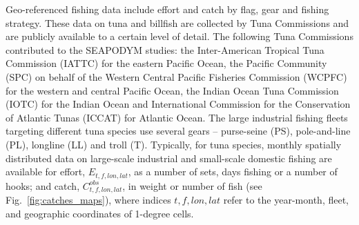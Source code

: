 Geo-referenced fishing data include effort and catch by flag, gear and fishing strategy. These data on tuna and billfish are collected by Tuna Commissions and are publicly available to a certain level of detail. The following Tuna Commissions contributed to the SEAPODYM studies: the Inter-American Tropical Tuna Commission (IATTC) for  the eastern Pacific Ocean, the Pacific Community (SPC) on behalf of the Western Central Pacific Fisheries Commission (WCPFC) for the western and central Pacific Ocean, the Indian Ocean Tuna Commission (IOTC) for the Indian Ocean and International Commission for the Conservation of Atlantic Tunas (ICCAT) for Atlantic Ocean. The large industrial fishing fleets targeting different tuna species use several gears -- purse-seine (PS), pole-and-line (PL), longline (LL) and troll (T). Typically, for tuna species, monthly spatially distributed data on large-scale industrial and small-scale domestic fishing are available for effort, $E_{t,f,lon,lat}$, as a number of sets, days fishing or a number of hooks; and catch, $C^{obs}_{t,f,lon,lat}$, in weight or number of fish (see Fig.~\ref{fig:catches_maps}), where indices $t,f,lon,lat$ refer to the year-month, fleet, and geographic coordinates of 1-degree cells.

